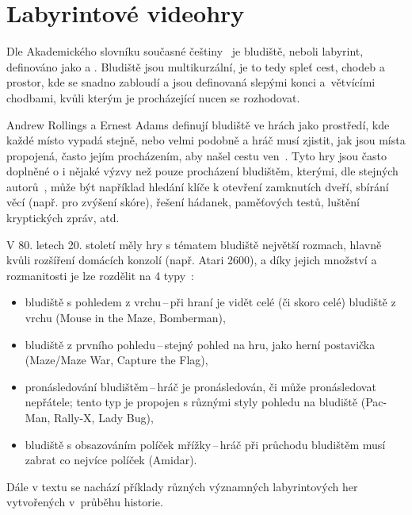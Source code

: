 \section{Labyrintové videohry}
Dle Akademického slovníku současné češtiny~\cite{AkademickySlovnik-Bludiste} je bludiště, neboli labyrint, definováno jako  a . Bludiště jsou multikurzální, je to tedy spleť cest, chodeb a prostor, kde se snadno zabloudí a jsou definovaná slepými konci a~větvícími chodbami, kvůli kterým je procházející nucen se rozhodovat.

Andrew Rollings a Ernest Adams definují bludiště ve hrách jako prostředí, kde každé místo vypadá stejně, nebo velmi podobně a hráč musí zjistit, jak jsou místa propojená, často jejím procházením, aby našel cestu ven~\cite{rollings2003andrew}. Tyto hry jsou často doplněné o i nějaké výzvy než pouze procházení bludištěm, kterými, dle stejných autorů~\cite{rollings2003andrew}, může být například hledání klíče k otevření zamknutích dveří, sbírání věcí (např. pro zvýšení skóre), řešení hádanek, paměťových testů, luštění kryptických zpráv, atd.

V 80. letech 20. století měly hry s tématem bludiště největší rozmach, hlavně kvůli rozšíření domácích konzolí (např. Atari 2600), a díky jejich množství a rozmanitosti je lze rozdělit na 4 typy~\cite{DoYouMaze}:
\begin{itemize}
    \item bludiště s pohledem z vrchu\,--\,při hraní je vidět celé (či skoro celé) bludiště z vrchu (Mouse in the Maze, Bomberman),
    \item bludiště z prvního pohledu\,--\,stejný pohled na hru, jako herní postavička (Maze/Maze War, Capture the Flag),
    \item pronásledování bludištěm\,--\,hráč je pronásledován, či může pronásledovat nepřátele; tento typ je propojen s různými styly pohledu na bludiště (Pac-Man, Rally-X, Lady Bug),
    \item bludiště s obsazováním políček mřížky\,--\,hráč při průchodu bludištěm musí zabrat co nejvíce políček (Amidar).
\end{itemize}

\noindent Dále v textu se nachází příklady různých významných labyrintových her vytvořených v~průběhu historie.

